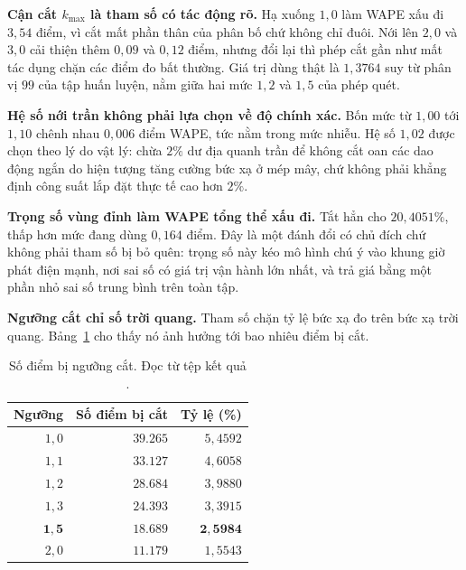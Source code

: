 \textbf{Cận cắt $k_{\max}$ là tham số có tác động rõ.} Hạ xuống $1{,}0$ làm WAPE xấu đi
$3{,}54$ điểm, vì cắt mất phần thân của phân bố chứ không chỉ đuôi. Nới lên $2{,}0$ và $3{,}0$
cải thiện thêm $0{,}09$ và $0{,}12$ điểm, nhưng đổi lại thì phép cắt gần như mất tác dụng chặn
các điểm đo bất thường. Giá trị dùng thật là $1{,}3764$ suy từ phân vị $99$ của tập huấn
luyện, nằm giữa hai mức $1{,}2$ và $1{,}5$ của phép quét.

\textbf{Hệ số nới trần không phải lựa chọn về độ chính xác.} Bốn mức từ $1{,}00$ tới $1{,}10$
chênh nhau $0{,}006$ điểm WAPE, tức nằm trong mức nhiễu. Hệ số $1{,}02$ được chọn theo lý do
vật lý: chừa $2\%$ dư địa quanh trần để không cắt oan các dao động ngắn do hiện tượng tăng
cường bức xạ ở mép mây, chứ không phải khẳng định công suất lắp đặt thực tế cao hơn $2\%$.

\textbf{Trọng số vùng đỉnh làm WAPE tổng thể xấu đi.} Tắt hẳn cho $20{,}4051\%$, thấp hơn mức
đang dùng $0{,}164$ điểm. Đây là một đánh đổi có chủ đích chứ không phải tham số bị bỏ quên:
trọng số này kéo mô hình chú ý vào khung giờ phát điện mạnh, nơi sai số có giá trị vận hành
lớn nhất, và trả giá bằng một phần nhỏ sai số trung bình trên toàn tập.

\textbf{Ngưỡng cắt chỉ số trời quang.} Tham số  chặn tỷ lệ bức xạ đo trên bức xạ
trời quang. Bảng~\ref{tab:clip_csi} cho thấy nó ảnh hưởng tới bao nhiêu điểm bị cắt.

\begin{table}[htbp]
\centering

\small
\begin{tabular}{r r r}
\toprule
\textbf{Ngưỡng} & \textbf{Số điểm bị cắt} & \textbf{Tỷ lệ (\%)} \\
\midrule
$1{,}0$ & $39.265$ & $5{,}4592$ \\
$1{,}1$ & $33.127$ & $4{,}6058$ \\
$1{,}2$ & $28.684$ & $3{,}9880$ \\
$1{,}3$ & $24.393$ & $3{,}3915$ \\
$\mathbf{1{,}5}$ & $\mathbf{18.689}$ & $\mathbf{2{,}5984}$ \\
$2{,}0$ & $11.179$ & $1{,}5543$ \\
\bottomrule
\end{tabular}
\caption[Số điểm bị ngưỡng  cắt]{Số điểm bị ngưỡng  cắt. Đọc từ tệp kết quả
.}
\label{tab:clip_csi}
\end{table}


